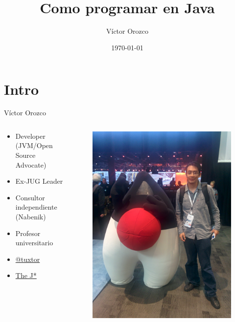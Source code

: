 \documentclass{beamer}
\title{Como programar en Java}
\author{Víctor Orozco}
\institute{Nabenik}
\date{\today}
\begin{document}
\frame{\titlepage}

\section{Intro}


\begin{frame}{Víctor Orozco}
     \begin{columns}[T] %
	     \begin{column}[T]{5cm} %
				\begin{itemize}
				\item Developer (JVM/Open Source Advocate)
				\item Ex-JUG Leader
				\item Consultor independiente (Nabenik)
				\item Profesor universitario
				\item \href{https://twitter.com/tuxtor}{@tuxtor}
				\item \href{http://vorozco.com}{The J*} 
				\end{itemize}
	     \end{column}
	     \begin{column}[T]{5cm} %
			\begin{figure}
			\centering
			\includegraphics[width=0.7\linewidth]{Images/j1.jpg}
			\end{figure}

	     \end{column}
     \end{columns}
\end{frame}
\end{document}
